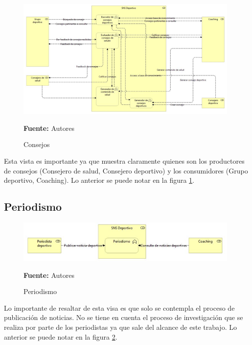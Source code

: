 \begin{figure}[!htb]
  \begin{center}
    \includegraphics[width=11cm]{./imagenes/Archimate/vistas/business_functions/Consejos.png}
    \caption{Consejos}
    \label{fig:BF_Consejos}
    \textbf{Fuente:}  Autores \\
  \end{center}
\end{figure}

Esta vista es importante ya que muestra claramente quienes son los productores de consejos (Consejero de salud, Consejero deportivo) y los consumidores (Grupo deportivo, Coaching). Lo anterior se puede notar en la figura \ref{fig:BF_Consejos}.

\subsection{Periodismo}

\begin{figure}[!htb]
  \begin{center}
    \includegraphics[width=11cm]{./imagenes/Archimate/vistas/business_functions/Periodismo.png}
    \caption{Periodismo}
    \label{fig:BF_Periodismo}
    \textbf{Fuente:}  Autores \\
  \end{center}
\end{figure}

Lo importante de resaltar de esta visa es que solo se contempla el proceso de publicación de noticias. No se tiene en cuenta el proceso de investigación que se realiza por parte de los periodistas ya que sale del alcance de este trabajo.  Lo anterior se puede notar en la figura \ref{fig:BF_Periodismo}.

